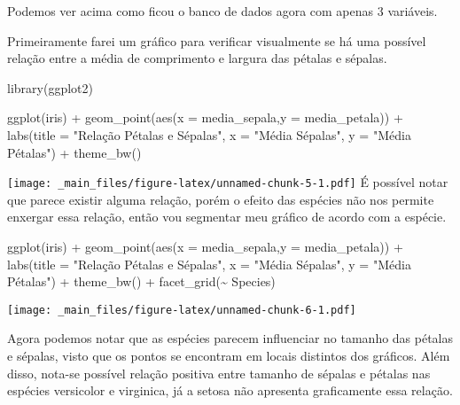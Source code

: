 \documentclass[
]{book}
\newenvironment{Shaded}{\begin{snugshade}}{\end{snugshade}}
\newcommand{\AttributeTok}[1]{\textcolor[rgb]{0.77,0.63,0.00}{#1}}
\newcommand{\FunctionTok}[1]{\textcolor[rgb]{0.00,0.00,0.00}{#1}}
\newcommand{\NormalTok}[1]{#1}
\newcommand{\SpecialCharTok}[1]{\textcolor[rgb]{0.00,0.00,0.00}{#1}}
\newcommand{\StringTok}[1]{\textcolor[rgb]{0.31,0.60,0.02}{#1}}
\begin{document}
Podemos ver acima como ficou o banco de dados agora com apenas 3 variáveis.

Primeiramente farei um gráfico para verificar visualmente se há uma possível relação entre a média de comprimento e largura das pétalas e sépalas.

\begin{Shaded}
\begin{Highlighting}[]
\FunctionTok{library}\NormalTok{(ggplot2)}

\FunctionTok{ggplot}\NormalTok{(iris) }\SpecialCharTok{+}
  \FunctionTok{geom\_point}\NormalTok{(}\FunctionTok{aes}\NormalTok{(}\AttributeTok{x =}\NormalTok{ media\_sepala,}\AttributeTok{y =}\NormalTok{ media\_petala)) }\SpecialCharTok{+}
  \FunctionTok{labs}\NormalTok{(}\AttributeTok{title =} \StringTok{"Relação Pétalas e Sépalas"}\NormalTok{,}
       \AttributeTok{x =} \StringTok{"Média Sépalas"}\NormalTok{,}
       \AttributeTok{y =} \StringTok{"Média Pétalas"}\NormalTok{) }\SpecialCharTok{+}
  \FunctionTok{theme\_bw}\NormalTok{()}
\end{Highlighting}
\end{Shaded}

\texttt{[image: \_main\_files/figure-latex/unnamed-chunk-5-1.pdf]}
É possível notar que parece existir alguma relação, porém o efeito das espécies não nos permite enxergar essa relação, então vou segmentar meu gráfico de acordo com a espécie.

\begin{Shaded}
\begin{Highlighting}[]
\FunctionTok{ggplot}\NormalTok{(iris) }\SpecialCharTok{+}
  \FunctionTok{geom\_point}\NormalTok{(}\FunctionTok{aes}\NormalTok{(}\AttributeTok{x =}\NormalTok{ media\_sepala,}\AttributeTok{y =}\NormalTok{ media\_petala)) }\SpecialCharTok{+}
  \FunctionTok{labs}\NormalTok{(}\AttributeTok{title =} \StringTok{"Relação Pétalas e Sépalas"}\NormalTok{,}
       \AttributeTok{x =} \StringTok{"Média Sépalas"}\NormalTok{,}
       \AttributeTok{y =} \StringTok{"Média Pétalas"}\NormalTok{) }\SpecialCharTok{+}
  \FunctionTok{theme\_bw}\NormalTok{() }\SpecialCharTok{+}
  \FunctionTok{facet\_grid}\NormalTok{(}\SpecialCharTok{\textasciitilde{}}\NormalTok{ Species)}
\end{Highlighting}
\end{Shaded}

\texttt{[image: \_main\_files/figure-latex/unnamed-chunk-6-1.pdf]}

Agora podemos notar que as espécies parecem influenciar no tamanho das pétalas e sépalas, visto que os pontos se encontram em locais distintos dos gráficos. Além disso, nota-se possível relação positiva entre tamanho de sépalas e pétalas nas espécies versicolor e virginica, já a setosa não apresenta graficamente essa relação.
\end{document}
